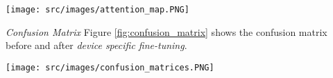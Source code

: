 \documentclass{article}
\begin{document}
\begin{figure*}[!hbtp]
\begin{center}
    \centering
    \texttt{[image: src/images/attention\_map.PNG]}
\end{center}
\vspace{-4mm}
    \caption{\textit{Global average of attention maps computed using Grad-Cam++\cite{gradcampp} for samples in the test split before and after employing the blank region clipping scheme during network training.}} 
    \label{fig:attention_maps}
\end{figure*}

\smallskip \textit{Confusion Matrix} Figure \ref{fig:confusion_matrix} shows the confusion matrix before and after \textit{device specific fine-tuning}.

\begin{figure*}[!hbtp]
\begin{center}
    \centering
    \texttt{[image: src/images/confusion\_matrices.PNG]}
\end{center}
\vspace{-2mm}
    \caption{\textit{Confusion matrices before and after device-wise fine-tuning.}} 
    \label{fig:confusion_matrix}
\end{figure*}
 
\end{document}
